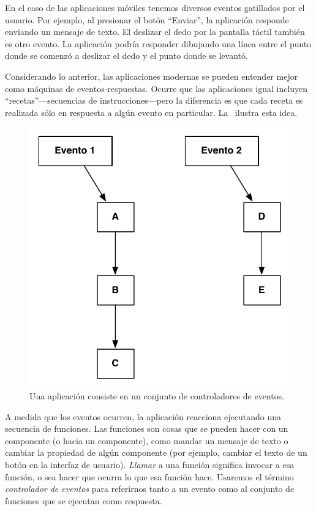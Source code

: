 \documentclass[letterpaper]{article}
\begin{document}
En el caso de las aplicaciones móviles tenemos diversos eventos
gatillados por el usuario. Por ejemplo, al presionar el botón
``Enviar'', la aplicación responde enviando un mensaje de texto. El
deslizar el dedo por la pantalla táctil también es otro evento. La
aplicación podría responder dibujando una línea entre el punto donde
se comenzó a deslizar el dedo y el punto donde se levantó.

Considerando lo anterior, las aplicaciones modernas se pueden entender
mejor como máquinas de eventos-respuestas. Ocurre que las aplicaciones
igual incluyen “recetas”—secuencias de instrucciones—pero la
diferencia es que cada receta es realizada sólo en respuesta a algún
evento en particular. La~ ilustra esta idea.

\begin{figure}[H]
\centering
\includegraphics[scale=0.5]{figures/EventHandlers}
\caption{Una aplicación consiste en un conjunto de controladores de eventos.}
\label{fig:eventHandlers}
\end{figure}

A medida que los eventos ocurren, la aplicación reacciona ejecutando
una secuencia de funciones. Las funciones son cosas que se pueden
hacer con un componente (o hacia un componente), como mandar un
mensaje de texto o cambiar la propiedad de algún componente (por
ejemplo, cambiar el texto de un botón en la interfaz de
usuario). \emph{Llamar} a una función significa invocar a esa función,
o sea hacer que ocurra lo que esa función hace. Usaremos el término
\emph{controlador de eventos} para referirnos tanto a un evento como
al conjunto de funciones que se ejecutan como respuesta.
\end{document}
